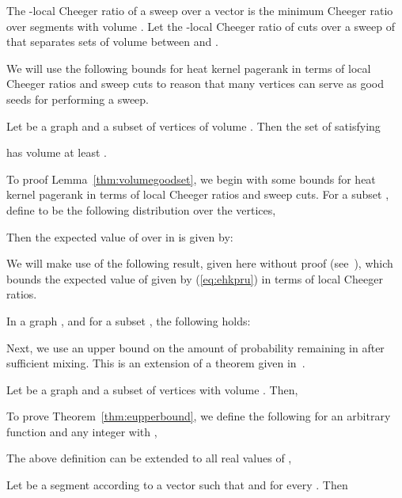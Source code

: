 \documentclass[runningheads,a4paper]{llncs}
\begin{document}
The -local Cheeger ratio of a sweep over a vector  is the
minimum Cheeger ratio over segments  with volume .  Let  the -local Cheeger ratio of
cuts over a sweep of  that separates sets of volume between  and
.

We will use the following bounds for heat kernel pagerank in terms of local
Cheeger ratios and sweep cuts to reason that many vertices  can serve as good
seeds for performing a sweep.

\begin{lemma}
\label{thm:volumegoodset}
Let  be a graph and  a subset of vertices of volume .  Then the set of  satisfying

has volume at least .
\end{lemma}

To proof Lemma~\ref{thm:volumegoodset}, we begin with some bounds for heat
kernel pagerank in terms of local Cheeger ratios and sweep cuts.  For a subset
, define  to be the following distribution over the vertices,

Then the expected value of  over  in  is given by:


We will make use of the following result, given here without proof
(see~\cite{chung:partitionhkpr:im09}), which bounds the expected value of
 given by (\ref{eq:ehkpru}) in terms of local Cheeger ratios.

\begin{lemma}
\label{lem:lowerbound}
In a graph , and for a subset , the following holds:

\end{lemma}

Next, we use an upper bound on the amount of probability remaining in  after
sufficient mixing.  This is an extension of a theorem given
in~\cite{chung:partitionhkpr:im09}.

\begin{theorem}
\label{thm:eupperbound}
Let  be a graph and  a subset of vertices with volume .  Then,

\end{theorem}

To prove Theorem~\ref{thm:eupperbound}, we define the following for an arbitrary
function  and any integer  with ,

The above definition can be extended to all real values of ,


\begin{claim}\label{claim:f}
Let  be a segment according to a vector  such that
 and  for every .  Then 
\end{claim}
\end{document}
